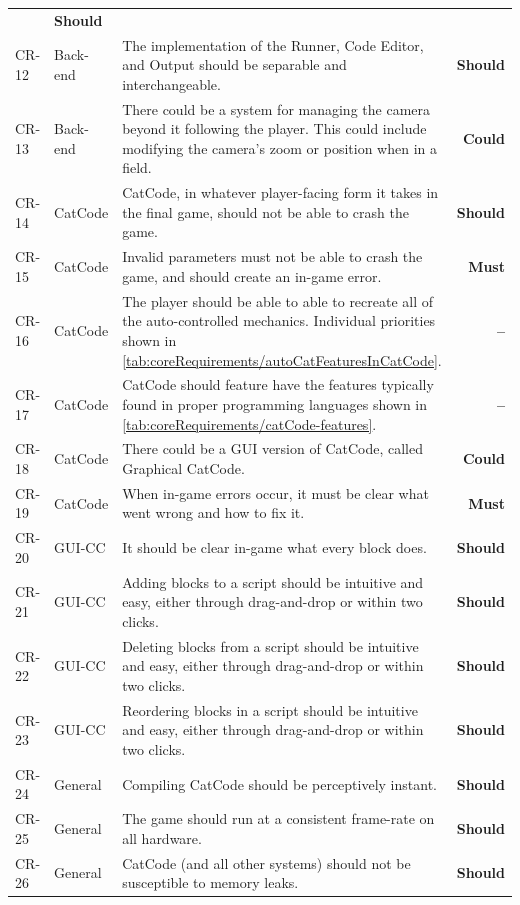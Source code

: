 \begin{center}
\begin{longtable}{llp{9.5cm}r}
    & \textbf{Should}
    \\
    CR-12
    & Back-end
    & The implementation of the Runner, Code Editor, and Output should be separable and interchangeable.
    & \textbf{Should}
    \\
    CR-13
    & Back-end
    & There could be a system for managing the camera beyond it following the player. This could include modifying the camera's zoom or position when in a field.
    & \textbf{Could}
    \\
    CR-14
    & CatCode
    & CatCode, in whatever player-facing form it takes in the final game, should not be able to crash the game.
    & \textbf{Should}
    \\
    CR-15
    & CatCode
    & Invalid parameters must not be able to crash the game, and should create an in-game error.
    & \textbf{Must}
    \\
    CR-16
    & CatCode
    & The player should be able to able to recreate all of the auto-controlled mechanics. Individual priorities shown in \autoref{tab:coreRequirements/autoCatFeaturesInCatCode}.
    & \textbf{--}
    \\
    CR-17
    & CatCode
    & CatCode should feature have the features typically found in proper programming languages shown in \autoref{tab:coreRequirements/catCode-features}.
    & \textbf{--}
    \\
    CR-18
    & CatCode
    & There could be a GUI version of CatCode, called Graphical CatCode.
    & \textbf{Could}
    \\
    CR-19
    & CatCode
    & When in-game errors occur, it must be clear what went wrong and how to fix it.
    & \textbf{Must}
    \\
    CR-20
    & GUI-CC
    & It should be clear in-game what every block does.
    & \textbf{Should}
    \\
    CR-21
    & GUI-CC
    & Adding blocks to a script should be intuitive and easy, either through drag-and-drop or within two clicks.
    & \textbf{Should}
    \\
    CR-22
    & GUI-CC
    & Deleting blocks from a script should be intuitive and easy, either through drag-and-drop or within two clicks.
    & \textbf{Should}
    \\
    CR-23
    & GUI-CC
    & Reordering blocks in a script should be intuitive and easy, either through drag-and-drop or within two clicks.
    & \textbf{Should}
    \\
    CR-24
    & General
    & Compiling CatCode should be perceptively instant.
    & \textbf{Should}
    \\
    CR-25
    & General
    & The game should run at a consistent frame-rate on all hardware.
    & \textbf{Should}
    \\
    CR-26
    & General
    & CatCode (and all other systems) should not be susceptible to memory leaks.
    & \textbf{Should}
    \\
    \bottomrule
  \end{longtable}
\end{center}

